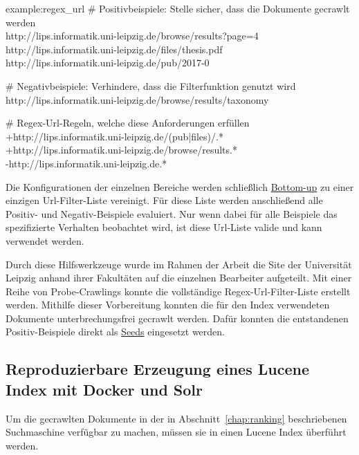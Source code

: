 \begin{example}{example:regex_url}
\# Positivbeispiele: Stelle sicher, dass die Dokumente gecrawlt werden\\
http://lips.informatik.uni-leipzig.de/browse/results?page=4\\
http://lips.informatik.uni-leipzig.de/files/thesis.pdf\\
http://lips.informatik.uni-leipzig.de/pub/2017-0

\# Negativbeispiele: Verhindere, dass die Filterfunktion genutzt wird\\
http://lips.informatik.uni-leipzig.de/browse/results/taxonomy%

\# Regex-Url-Regeln, welche diese Anforderungen erfüllen\\
+http://lips.informatik.uni-leipzig.de/(pub|files)/.*\\
+http://lips.informatik.uni-leipzig.de/browse/results.*\\
-http://lips.informatik.uni-leipzig.de.*\\
\end{example}

Die Konfigurationen der einzelnen Bereiche werden schließlich \href{https://de.wikipedia.org/wiki/Top-down_und_Bottom-up}{Bottom-up} zu einer einzigen 
Url-Filter-Liste vereinigt.
Für diese Liste werden anschließend alle Positiv- und Negativ-Beispiele evaluiert.
Nur wenn dabei für alle Beispiele das spezifizierte Verhalten beobachtet wird, ist diese Url-Liste valide und kann verwendet werden.

Durch diese Hilfswerkzeuge wurde im Rahmen der Arbeit die Site der Universität Leipzig anhand ihrer Fakultäten auf die einzelnen Bearbeiter aufgeteilt.
Mit einer Reihe von Probe-Crawlings konnte die vollständige Regex-Url-Filter-Liste erstellt werden.
Mithilfe dieser Vorbereitung konnten die für den Index verwendeten Dokumente unterbrechungsfrei gecrawlt werden.
Dafür konnten die entstandenen Positiv-Beispiele direkt als \href{https://wiki.apache.org/nutch/NutchTutorial#Create_a_URL_seed_list-1}{Seeds} eingesetzt werden.

\subsection{Reproduzierbare Erzeugung eines Lucene Index mit Docker und Solr}

Um die gecrawlten Dokumente in der in Abschnitt~\ref{chap:ranking} beschriebenen Suchmaschine verfügbar zu machen, müssen sie in einen Lucene Index überführt werden.

